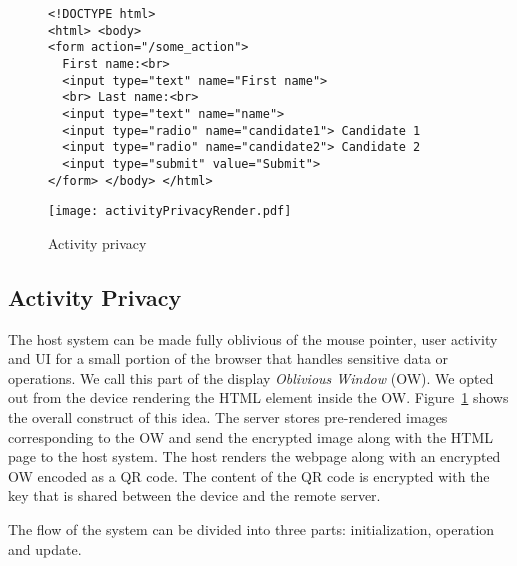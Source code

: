 \begin{figure}[t]
\small
\begin{lstlisting}[mathescape=true]
<!DOCTYPE html>
<html> <body>
<form action="/some_action">
  First name:<br>
  <input type="text" name="First name">
  <br> Last name:<br>
  <input type="text" name="name">
  <input type="radio" name="candidate1"> Candidate 1
  <input type="radio" name="candidate2"> Candidate 2
  <input type="submit" value="Submit">
</form> </body> </html>
\end{lstlisting} 
\end{figure}




\begin{figure}[h]
\centering
\texttt{[image: activityPrivacyRender.pdf]}
\caption{Activity privacy}
\label{fig:activityPrivacy}
\centering
\end{figure}


\subsection{Activity Privacy}
\label{sec:systemnDesign:mousePrivacy}

The host system can be made fully oblivious of the mouse pointer, user activity and UI for a small portion of the browser that handles sensitive data or operations. We call this part of the display \emph{Oblivious Window} (OW). We opted out from the device rendering the HTML element inside the OW. Figure~\ref{fig:activityPrivacy} shows the overall construct of this idea. The server stores pre-rendered images corresponding to the OW and send the encrypted image along with the HTML page to the host system. The host renders the webpage along with an encrypted OW encoded as a QR code. The content of the QR code is encrypted with the \tls key that is shared between the device and the remote server.

The flow of the system can be divided into three parts: initialization, operation and update.

